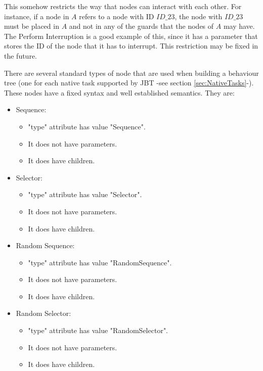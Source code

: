 \documentclass[a4paper,10pt]{article}
\begin{document}
This somehow restricts the way that nodes can interact with each other. For instance, if a node in $A$ refers to a node with ID $ID\_23$, the node with $ID\_23$ must be placed in $A$ and not in any of the guards that the nodes of $A$ may have. The Perform Interruption is a good example of this, since it has a parameter that stores the ID of the node that it has to interrupt. This restriction may be fixed in the future.

There are several standard types of node that are used when building a behaviour tree (one for each native task supported by JBT -see section \ref{sec:NativeTasks}-). These nodes have a fixed syntax and well established semantics. They are:

\begin{itemize}
 
\item Sequence:

  \begin{itemize}
  \item "type" attribute has value "Sequence".
  \item It does not have parameters.
  \item It does have children.
  \end{itemize}

\item Selector:

  \begin{itemize}
  \item "type" attribute has value "Selector".
  \item It does not have parameters.
  \item It does have children.
  \end{itemize}

\item Random Sequence:

  \begin{itemize}
  \item "type" attribute has value "RandomSequence".
  \item It does not have parameters.
  \item It does have children.
  \end{itemize}

\item Random Selector:

  \begin{itemize}
  \item "type" attribute has value "RandomSelector".
  \item It does not have parameters.
  \item It does have children.
  \end{itemize}


\end{itemize}
\end{document}
